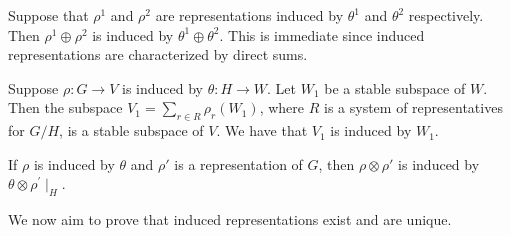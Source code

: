 \documentclass[letterpaper, 11pt, oneside]{book}
\begin{document}
\clearpage

\begin{ex}\label{ex:direct_sum_induced}
  Suppose that $\rho^{1}$ and $\rho^{2}$ are representations induced by $\theta^{1}$ and $\theta^{2}$ respectively.
  Then $\rho^{1} \oplus \rho^{2}$ is induced by $\theta^{1} \oplus \theta^{2}$.
  This is immediate since induced representations are characterized by direct sums.
\end{ex}

\begin{ex}\label{ex:stable_subspc_induced}
  Suppose $\rho\colon G \to V$ is induced by $\theta\colon H \to W$.
  Let $W_{1}$ be a stable subspace of $W$.
  Then the subspace $V_{1} = \sum_{r \in R} \rho_{r}(W_{1})$, where $R$ is a system of representatives for $G / H$, is a stable subspace of $V$.
  We have that $V_{1}$ is induced by $W_{1}$.
\end{ex}

\begin{ex}
  If $\rho$ is induced by $\theta$ and $\rho'$ is a representation of $G$, then $\rho \otimes \rho'$ is induced by $\theta \otimes \rho^{'}\mid_{H}$.
\end{ex}

We now aim to prove that induced representations exist and are unique.
\end{document}
